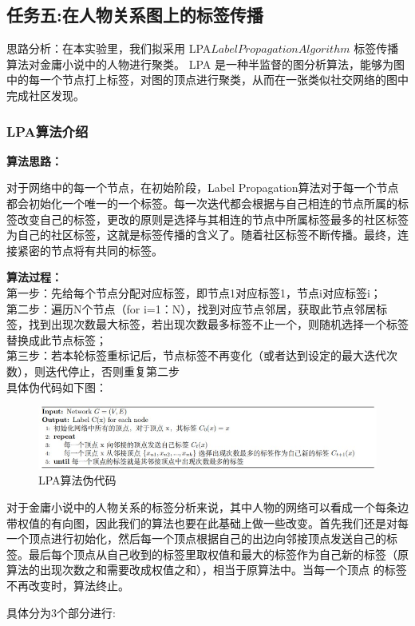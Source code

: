 \documentclass[a4paper,UTF8]{article}
\numberwithin{equation}{section}
\begin{document}
\subsection{任务五:在人物关系图上的标签传播}
思路分析：在本实验里，我们拟采用 LPA\(Label Propagation Algorithm\) 标签传播算法对金庸小说中的人物进行聚类。 LPA 是一种半监督的图分析算法，能够为图中的每一个节点打上标签，对图的顶点进行聚类，从而在一张类似社交网络的图中完成社区发现。
\subsubsection{LPA算法介绍}
\textbf{算法思路：}\par
对于网络中的每一个节点，在初始阶段，Label Propagation算法对于每一个节点都会初始化一个唯一的一个标签。每一次迭代都会根据与自己相连的节点所属的标签改变自己的标签，更改的原则是选择与其相连的节点中所属标签最多的社区标签为自己的社区标签，这就是标签传播的含义了。随着社区标签不断传播。最终，连接紧密的节点将有共同的标签。\par
\textbf{算法过程：}\\
第一步：先给每个节点分配对应标签，即节点1对应标签1，节点i对应标签i；\\
第二步：遍历N个节点（for i=1：N），找到对应节点邻居，获取此节点邻居标签，找到出现次数最大标签，若出现次数最多标签不止一个，则随机选择一个标签替换成此节点标签；\\
第三步：若本轮标签重标记后，节点标签不再变化（或者达到设定的最大迭代次数），则迭代停止，否则重复第二步\\
具体伪代码如下图：
\begin{figure}[H]
    \centering

    \includegraphics[width = 15cm]{LPAcode.jpg}

    \caption{LPA算法伪代码}
\end{figure}
对于金庸小说中的人物关系的标签分析来说，其中人物的网络可以看成一个每条边带权值的有向图，因此我们的算法也要在此基础上做一些改变。首先我们还是对每一个顶点进行初始化，然后每一个顶点根据自己的出边向邻接顶点发送自己的标签。最后每个顶点从自己收到的标签里取权值和最大的标签作为自己新的标签（原算法的出现次数之和需要改成权值之和），相当于原算法中。当每一个顶点 的标签不再改变时，算法终止。\par
具体分为3个部分进行:
\end{document}
